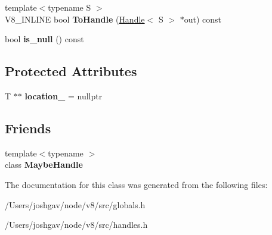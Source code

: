 \begin{DoxyCompactItemize}
\item 
{\footnotesize template$<$typename S $>$ }\\V8\+\_\+\+I\+N\+L\+I\+NE bool {\bfseries To\+Handle} (\hyperlink{classv8_1_1internal_1_1_handle}{Handle}$<$ S $>$ $\ast$out) const \hypertarget{classv8_1_1internal_1_1_maybe_handle_a1556d67e0f8313f518b01d14a5358e3e}{}\label{classv8_1_1internal_1_1_maybe_handle_a1556d67e0f8313f518b01d14a5358e3e}

\item 
bool {\bfseries is\+\_\+null} () const \hypertarget{classv8_1_1internal_1_1_maybe_handle_a36d37e001eeb9ebb2a1ac2a883937252}{}\label{classv8_1_1internal_1_1_maybe_handle_a36d37e001eeb9ebb2a1ac2a883937252}

\end{DoxyCompactItemize}
\subsection*{Protected Attributes}
\begin{DoxyCompactItemize}
\item 
T $\ast$$\ast$ {\bfseries location\+\_\+} = nullptr\hypertarget{classv8_1_1internal_1_1_maybe_handle_a20138eb8f5c61e4383463c739b2a8418}{}\label{classv8_1_1internal_1_1_maybe_handle_a20138eb8f5c61e4383463c739b2a8418}

\end{DoxyCompactItemize}
\subsection*{Friends}
\begin{DoxyCompactItemize}
\item 
{\footnotesize template$<$typename $>$ }\\class {\bfseries Maybe\+Handle}\hypertarget{classv8_1_1internal_1_1_maybe_handle_a43ca95cbc5708225727b3674f4690233}{}\label{classv8_1_1internal_1_1_maybe_handle_a43ca95cbc5708225727b3674f4690233}

\end{DoxyCompactItemize}


The documentation for this class was generated from the following files\+:\begin{DoxyCompactItemize}
\item 
/\+Users/joshgav/node/v8/src/globals.\+h\item 
/\+Users/joshgav/node/v8/src/handles.\+h\end{DoxyCompactItemize}
